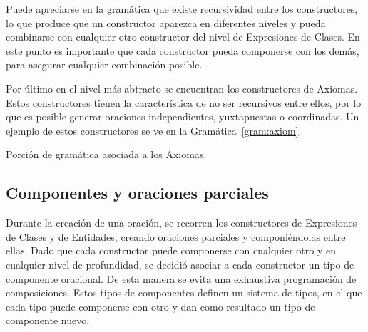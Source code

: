 Puede apreciarse en la gramática que existe recursividad entre los constructores, lo que produce que un constructor aparezca en diferentes niveles y pueda combinarse con cualquier otro constructor del nivel de Expresiones de Clases. En este punto es importante que cada constructor pueda componerse con los demás, para asegurar cualquier combinación posible.


Por último en el nivel más abtracto se encuentran los constructores de Axiomas. Estos constructores tienen la característica de no ser recursivos entre ellos, por lo que es posible generar oraciones independientes, yuxtapuestas o coordinadas. Un ejemplo de estos constructores se ve en la Gramática~\ref{gram:axiom}.

\begin{GrammarEnv}
\begin{grammar}
[(colon){$\rightarrow$}]
[(semicolon)$|$]
[(comma){}]
[(period){\vspace{0.3cm} \\}]
[(quote){\begin{bf}}{\end{bf}}]
[(nonterminal){$<$}{$>$}]
\end{grammar}
\caption{Porción de gramática asociada a los Axiomas.}\label{gram:axiom}
\end{GrammarEnv}

\subsection{Componentes y oraciones parciales}
Durante la creación de una oración, se recorren los constructores de Expresiones de Clases y de Entidades, creando oraciones parciales y componiéndolas entre ellas. Dado que cada constructor puede componerse con cualquier otro y en cualquier nivel de profundidad, se decidió asociar a cada constructor un tipo de componente oracional. De esta manera se evita una exhaustiva programación de composiciones. Estos tipos de componentes definen un sistema de tipos, en el que cada tipo puede componerse con otro y dan como resultado un tipo de componente nuevo. %


